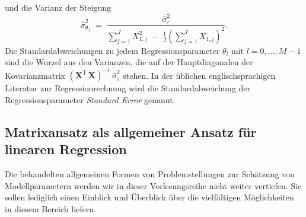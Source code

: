 und die Varianz der Steigung
\begin{equation}
\hat \sigma^2_{\theta_1} \; = \;
\frac{\hat \sigma^2_\varepsilon}{\sum\limits_{j=1}^J X_{1,j}^2 \; - \;
	\frac{1}{J}\left(\sum\limits_{j=1}^J X_{1,j}\right)^2} .
\end{equation}
Die Standardabweichungen zu jedem Regressionsparameter $\theta_l$ mit $l = 0,\dots,M-1$ sind
die Wurzel aus den Varianzen, die auf der Hauptdiagonalen der Kovarianzmatrix
$\left( \mathbf{X}^\mathsf{T}  \, \mathbf{X} \right)^{-1} \, \hat \sigma_{\varepsilon}^2$
stehen. In der üblichen englischsprachigen Literatur zur Regressionrechnung wird
die Standardabweichung der Regressionsparameter \textsl{Standard Error} genannt.




\subsection{Matrixansatz als allgemeiner Ansatz für linearen Regression}
Die behandelten allgemeinen Formen von Problemstellungen zur Schätzung von Modellparametern
werden wir in dieser Vorlesungsreihe nicht weiter vertiefen. Sie sollen lediglich einen Einblick und Überblick über die vielfältigen Möglichkeiten in diesem Bereich liefern.

